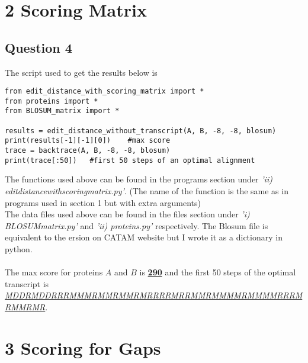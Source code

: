 \documentclass[10pt]{article}
\begin{document}
\newpage
\section*{2 Scoring Matrix}
\subsection*{Question 4}
The script used to get the results below is
\begin{lstlisting}
from edit_distance_with_scoring_matrix import *
from proteins import *
from BLOSUM_matrix import *

results = edit_distance_without_transcript(A, B, -8, -8, blosum)
print(results[-1][-1][0])    #max score
trace = backtrace(A, B, -8, -8, blosum)
print(trace[:50])   #first 50 steps of an optimal alignment
\end{lstlisting}
The functions used above can be found in the programs section under \emph{'ii) edit\textunderscore distance\textunderscore with\textunderscore scoring\textunderscore matrix.py'}. (The name of the function is the same as in programs used in section 1 but with extra arguments)\\
The data files used above can be found in the files section under \emph{'i) BLOSUM\textunderscore matrix.py'} and \emph{'ii) proteins.py'} respectively. The Blosum file is equivalent to the ersion on CATAM website but I wrote it as a dictionary in python.\\\\
The max score for proteins $A$ and $B$ is \underline{\textbf{290}} and the first 50 steps of the optimal transcript is\\
\underline{\textit{MDDRMDDRRRMMMRMMRMMRMRRRRMRRMMRMMMMRMMMMRRRMRMMRMR}}.\\

\section*{3 Scoring for Gaps}
\end{document}
